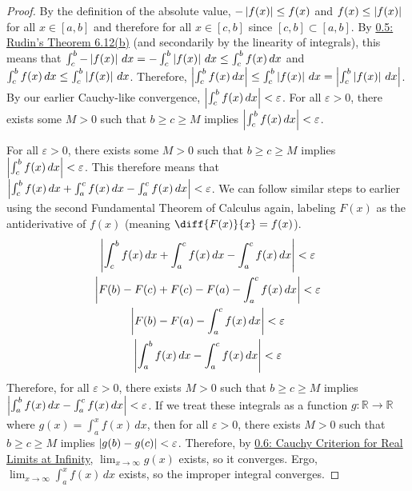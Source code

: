 \documentclass[11pt]{article}
\begin{document}
\begin{proof}
            By the definition of the absolute value, $-\left| f(x) \right| \leq f(x)$ and $f(x) \leq \left| f(x) \right|$ for all $x \in [a,b]$ and therefore for all $x \in [c,b]$ since $[c,b] \subset [a,b]$.
            By \hyperref[thm:5]{0.5: Rudin's Theorem 6.12(b)} (and secondarily by the linearity of integrals), this means that $\int_{c}^{b} -\left| f(x) \right|\,dx = -\int_{c}^{b} \left| f(x) \right|\,dx \leq \int_{c}^{b} f(x)\,dx$ and $\int_{c}^{b} f(x)\,dx \leq \int_{c}^{b} \left| f(x) \right|\,dx$.
            Therefore, $\left| \int_{c}^{b} f(x)\,dx \right| \leq \int_{c}^{b} \left| f(x) \right|\,dx = \left| \int_{c}^{b} \left| f(x) \right|\,dx \right|$.
            By our earlier Cauchy-like convergence, $\left| \int_{c}^{b} f(x)\,dx \right| < \varepsilon$.
            For all $\varepsilon > 0$, there exists some $M > 0$ such that $b \geq c \geq M$ implies $\left| \int_{c}^{b} f(x)\,dx \right| < \varepsilon$.

            For all $\varepsilon > 0$, there exists some $M > 0$ such that $b \geq c \geq M$ implies $\left| \int_{c}^{b} f(x)\,dx \right| < \varepsilon$.
            This therefore means that $\left| \int_{c}^{b} f(x)\,dx + \int_{a}^{c} f(x)\,dx - \int_{a}^{c} f(x)\,dx \right| < \varepsilon$.
            We can follow similar steps to earlier using the second Fundamental Theorem of Calculus again, labeling $F(x)$ as the antiderivative of $f(x)$ (meaning $\diff{F(x)}{x} = f(x)$).
            \begin{gather}
                \left| \int_{c}^{b} f(x)\,dx + \int_{a}^{c} f(x)\,dx - \int_{a}^{c} f(x)\,dx \right| < \varepsilon\\
                \left| F(b) - F(c) + F(c) - F(a) - \int_{a}^{c} f(x)\,dx \right| < \varepsilon\\
                \left| F(b) - F(a) - \int_{a}^{c} f(x)\,dx \right| < \varepsilon\\
                \left| \int_{a}^{b} f(x)\,dx - \int_{a}^{c} f(x)\,dx \right| < \varepsilon
            \end{gather}
            Therefore, for all $\varepsilon > 0$, there exists $M > 0$ such that $b \geq c \geq M$ implies $\left| \int_{a}^{b} f(x)\,dx - \int_{a}^{c} f(x)\,dx \right| < \varepsilon$.
            If we treat these integrals as a function $g: \mathbb{R} \to \mathbb{R}$ where $g(x) = \int_{a}^{x} f(x)\,dx$, then for all $\varepsilon > 0$, there exists $M > 0$ such that $b \geq c \geq M$ implies $\left| g(b) - g(c) \right| < \varepsilon$.
            Therefore, by \hyperref[thm:6]{0.6: Cauchy Criterion for Real Limits at Infinity}, $\lim_{x \to \infty} g(x)$ exists, so it converges.
            Ergo, $\lim_{x \to \infty} \int_{a}^{x} f(x)\,dx$ exists, so the improper integral converges.
        \end{proof}
\end{document}
